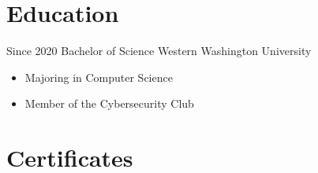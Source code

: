 \documentclass[letterpaper]{twentysecondcv} %
\begin{document}
\makeprofile %





\section{Education}

\begin{twenty} %
	\twentyitem
		{Since 2020}
		{Bachelor of Science}
		{Western Washington University}
		{\begin{itemize}
			\item Majoring in Computer Science
			\item Member of the Cybersecurity Club
		\end{itemize}}
\end{twenty}


\section{Certificates}

\begin{twentyshort} %
\end{twentyshort}
\end{document}
